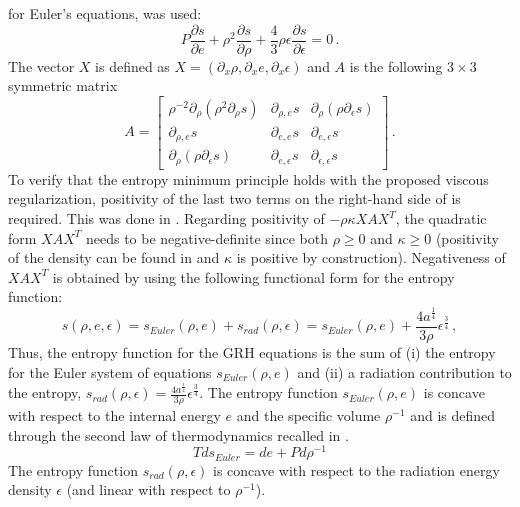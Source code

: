 \documentclass[times]{fldauth}
\begin{document}
for Euler's equations, was used:
%
\begin{equation} 
\label{eq:visc_reg_assumptions}
P \frac{\partial s}{\partial e} + \rho^2 \frac{\partial s}{\partial \rho} + \frac{4}{3} \rho \epsilon \frac{\partial s}{\partial \epsilon} = 0 \,. 
\end{equation}
%
The vector $X$ is defined as $X=\left( \partial_x \rho, \partial_x e, \partial_x \epsilon \right)$ and $A$ is the 
following $3 \times 3$ symmetric matrix
%
 \begin{equation}
 A = 
\begin{bmatrix}
\rho^{-2}\partial_{\rho} \left( \rho^2 \partial_{\rho} s \right) & \partial_{\rho,e} s & \partial_{\rho} \left( \rho \partial_{\epsilon} s \right) \\
 \partial_{\rho,e} s & \partial_{e,e} s & \partial_{e,\epsilon} s \\
 \partial_{\rho} \left( \rho \partial_{\epsilon} s \right) & \partial_{e,\epsilon} s & \partial_{\epsilon,\epsilon} s
\end{bmatrix}
\,.
\end{equation}
%
To verify that the entropy minimum principle holds with the proposed viscous regularization,
positivity of the last two terms on the right-hand side of  is required. 
This was done in \cite{our_jcp_radhy_paper}. Regarding positivity of $- \rho \kappa X A X^T$, the quadratic form $ X A 
X^T$ needs to be negative-definite since both $\rho \geq 0$ and $\kappa \geq 0$ (positivity of the density can be found
in \cite{jlg} and $\kappa$ is positive by construction). Negativeness of $X A X^T$ is obtained by using the following
functional form for the entropy function:
%
\begin{equation}
\label{eq:ent_equ}
s( \rho, e, \epsilon) = s_{Euler}(\rho, e) + s_{rad}(\rho, \epsilon) = s_{Euler}(\rho, e)+ \frac{4a^{\tfrac{1}{4}}}{3\rho} \epsilon^{\tfrac{3}{4}} \, ,
\end{equation}
%
Thus, the entropy function for the GRH equations is the sum of (i) the entropy for the Euler system of equations 
$s_{Euler}(\rho, e)$ and (ii) a radiation contribution to the entropy,
$s_{rad}(\rho,\epsilon)=\tfrac{4 a^\frac{1}{4}}{3\rho} \epsilon^\frac{3}{4}$. 
The entropy function $s_{Euler}(\rho, e)$ is concave with respect to the internal energy $e$ and the specific volume 
$\rho^{-1}$ and is defined through the second law of thermodynamics recalled in .
%
\begin{equation}\label{eq:scn-law-th}
Tds_{Euler} = de + P d \rho^{-1}
\end{equation}
%
The entropy function $s_{rad}(\rho,\epsilon)$ is concave with respect to the radiation energy density $\epsilon$
(and linear with respect to $\rho^{-1}$). 
\end{document}
